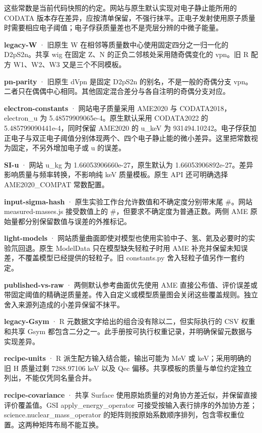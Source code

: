 \documentclass[
  11pt,
  letterpaper,
]{article}
\begin{document}
这些常数是当前代码快照的约定。网站与原生默认实现对电子静止能所用的
CODATA
版本存在差异，应按清单保留，不强行抹平。正电子发射使用原子质量时需要相应电子阈值；电子俘获质量差也不是壳层分辨的中微子能量。

\textbf{legacy-W} · 旧原生 W 在相邻等质量数中心使用固定四分之一归一化的
D2pS2n。共享 wig 在固定 Z、N 的正负二邻核处采用随奇偶变化的 vpn。旧 R
配方 W1、W2、W3 又是三个不同模板。

\textbf{pn-parity} · 旧原生 dVpn 是固定 D2pS2n
的别名，不是一般的奇偶分支
vpn。二者只在偶偶中心相同。其他固定混合差分与各自注明的奇偶分支对应。

\textbf{electron-constants} · 网站电子质量采用 AME2020 与
CODATA2018，electron\_u 为 5.48579909065e-4。原生默认采用 CODATA2022 的
5.485799090441e-4，同时保留 AME2020 的 u\_keV 为
931494.10242。电子俘获加正电子与双正电子阈值分别体现两个、四个电子静止能的微小差异。这里把常数视为固定，不另外增加电子或
u 的误差。

\textbf{SI-u} · 网站 u\_kg 为 1.66053906660e-27，原生默认为
1.66053906892e-27。差异影响质量与频率转换，不影响纯 keV 质量模板。原生
API 还可明确选择 AME2020\_COMPAT 常数配置。

\textbf{input-sigma-hash} · 原生实验工作台允许数值和不确定度分别带末尾
\#。网站 measured-masses.js 接受数值上的
\#，但要求不确定度为普通正数。两侧 AME
原始量都分别保留数值与误差的外推标记。

\textbf{light-models} ·
网站质量曲面即使对模型也使用实验中子、氢、氦及必要时的实验氘回退。原生
ModelData 只在模型缺失轻粒子时用 AME
补充并保留未知误差，不覆盖模型已经提供的轻粒子。旧 constants.py
舍入轻粒子值另作一套约定。

\textbf{published-vs-raw} · 两侧默认参考曲面优先使用 AME
直接公布值、评价误差或带固定阈值的精确逆质量差。传入自定义或模型质量图会关闭这些覆盖规则。独立舍入来源列造成的小差异保留不抹平。

\textbf{legacy-Gsym} · R 元数据文字给出的组合没有除以二，但实际执行的
CSV 权重和共享 Gsym
都包含二分之一。此手册按可执行权重记录，并明确保留元数据与实现差异。

\textbf{recipe-units} · R 派生配方输入结合能，输出可能为 MeV 或
keV；采用明确的旧 H 质量过剩 7288.97106 keV 以及 Qec
偏移。共享模板的质量与单位约定独立列出，不能仅凭同名量合并。

\textbf{recipe-covariance} · 共享 Surface
使用原始质量的对角协方差近似，并保留直接评价覆盖值。GSI
apply\_energy\_operator
可接受按输入表行排序的外加协方差；science.nuclear\_mass\_operator
的矩阵则按原始系数顺序排列，包含零权重位置。这两种矩阵布局不能互换。
\end{document}
